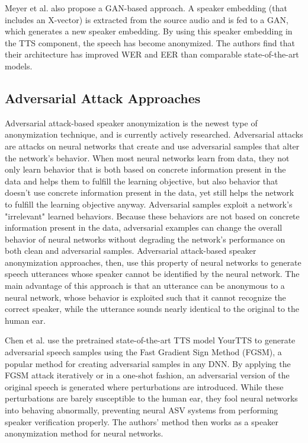 \documentclass{Interspeech2024}
\begin{document}
Meyer et al. \cite{meyer_2023_adversarial_gan} also propose a GAN-based approach. 
A speaker embedding (that includes an X-vector) is extracted from the source audio and is fed to a GAN, which generates a new speaker embedding. 
By using this speaker embedding in the TTS component, the speech has become anonymized. 
The authors find that their architecture has improved WER and EER than comparable state-of-the-art models.

\subsection{Adversarial Attack Approaches}
Adversarial attack-based speaker anonymization is the newest type of anonymization technique, and is currently actively researched.
Adversarial attacks are attacks on neural networks that create and use adversarial samples that alter the network's behavior.
When most neural networks learn from data, they not only learn behavior that is both based on concrete information present in the data and helps them to fulfill the learning objective, but also behavior that doesn't use concrete information present in the data, yet still helps the network to fulfill the learning objective anyway.
Adversarial samples exploit a network's "irrelevant" learned behaviors.
Because these behaviors are not based on concrete information present in the data, adversarial examples can change the overall behavior of neural networks without degrading the network's performance on both clean and adversarial samples.
Adversarial attack-based speaker anonymization approaches, then, use this property of neural networks to generate speech utterances whose speaker cannot be identified by the neural network.
The main advantage of this approach is that an utterance can be anonymous to a neural network, whose behavior is exploited such that it cannot recognize the correct speaker, while the utterance sounds nearly identical to the original to the human ear.

Chen et al. \cite{chen_2024_adversarial_yourtts} use the pretrained state-of-the-art TTS model YourTTS to generate adversarial speech samples using the Fast Gradient Sign Method (FGSM), a popular method for creating adversarial samples in any DNN. 
By applying the FGSM attack iteratively or in a one-shot fashion, an adversarial version of the original speech is generated where perturbations are introduced. 
While these perturbations are barely susceptible to the human ear, they fool neural networks into behaving abnormally, preventing neural ASV systems from performing speaker verification properly. 
The authors' method then works as a speaker anonymization method for neural networks.
\end{document}
